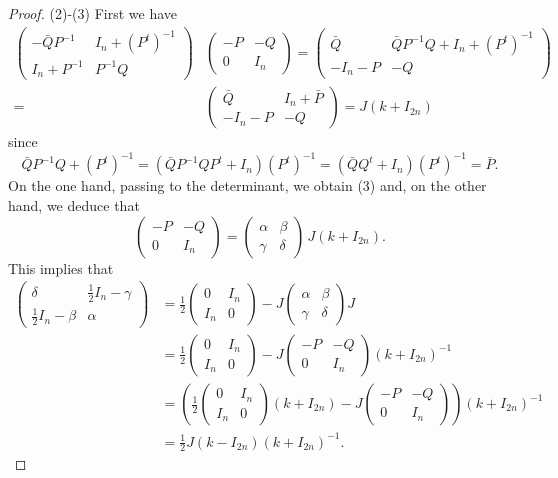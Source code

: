 \documentclass[10pt,a4paper]{amsart}
\begin{document}
\begin{proof}
(2)-(3) First we have
\begin{align*}
\begin{pmatrix}-{\bar Q}P^{-1} &I_n+(P^t)^{-1}\\
I_n+P^{-1}&P^{-1}Q \end{pmatrix}&\begin{pmatrix} -P&-Q\\
0&I_n \end{pmatrix}=\begin{pmatrix} {\bar Q}&{\bar Q}P^{-1}Q +I_n+(P^t)^{-1}\\
-I_n-P&-Q \end{pmatrix}\\=&\begin{pmatrix} {\bar Q}&I_n+{\bar P}\\
-I_n-P&-Q \end{pmatrix}=J(k+I_{2n})\end{align*}
since \begin{equation*}{\bar Q}P^{-1}Q +(P^t)^{-1}=({\bar Q}P^{-1}QP^t+I_n)(P^t)^{-1}=({\bar Q}Q^t+I_n)(P^t)^{-1}={\bar P}.\end{equation*}
On the one hand, passing to the determinant, we obtain (3) and, on the other hand, we 
deduce that
\begin{equation*}\begin{pmatrix} -P&-Q\\
0&I_n \end{pmatrix}=\begin{pmatrix} \alpha &\beta \\
\gamma & \delta  \end{pmatrix}\,J(k+I_{2n}).\end{equation*}
This implies that
\begin{align*}\begin{pmatrix}\delta &\tfrac{1}{2}I_n-\gamma\\
\tfrac{1}{2}I_n-\beta&\alpha \end{pmatrix}&=\frac{1}{2}\begin{pmatrix} 0&I_n\\
I_n&0 \end{pmatrix}-J\begin{pmatrix} \alpha &\beta \\
\gamma & \delta  \end{pmatrix}J\\
&=\frac{1}{2}\begin{pmatrix} 0&I_n\\
I_n&0 \end{pmatrix}-J\begin{pmatrix} -P&-Q\\
0&I_n \end{pmatrix}(k+I_{2n})^{-1}\\
&=\left( \frac{1}{2}\begin{pmatrix} 0&I_n\\
I_n&0 \end{pmatrix}(k+I_{2n})-J\begin{pmatrix} -P&-Q\\
0&I_n \end{pmatrix}\right)(k+I_{2n})^{-1}\\
&=\frac{1}{2}J(k-I_{2n})(k+I_{2n})^{-1}.
\end{align*}
\end{proof}
\end{document}
